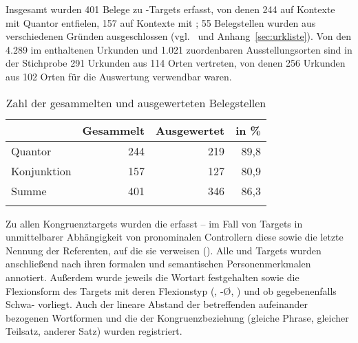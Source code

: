 \label{phsec:caohiatus}

Insgesamt wurden 401 Belege zu -Targets erfasst, von denen 244 auf
Kontexte mit Quantor entfielen, 157 auf Kontexte mit ; 55
Belegstellen wurden aus verschiedenen Gründen ausgeschlossen
(vgl.~ und Anhang~\ref{sec:urkliste}). Von den 4.289 im
\CAO{} enthaltenen Urkunden und 1.021 zuordenbaren Ausstellungsorten sind in
der Stichprobe 291 Urkunden aus 114 Orten vertreten, von denen 256 Urkunden aus
102 Orten für die Auswertung verwendbar waren.

\begin{table}
\centering
\caption{Zahl der gesammelten und ausgewerteten Belegstellen}
\begin{tabular}{l r r r}
\lsptoprule

%
	& Gesammelt
	& Ausgewertet
	& in \%
	\\

\midrule


Quantor
	& 244 %
	& 219 %
	& 89,8 %
	\\

Konjunktion
	& 157 %
	& 127 %
	& 80,9 %
	\\

\midrule

Summe
	& 401 %
	& 346 %
	& 86,3 %
	\\

\lspbottomrule
\end{tabular}
\label{tab:ausgewcao}
\end{table}

Zu allen Kongruenztargets wurden die  erfasst -- im Fall von
Targets in unmittelbarer Abhängigkeit von pronominalen
Controllern diese sowie die letzte Nennung der Referenten, auf
die sie verweisen (). Alle 
und Targets wurden anschließend nach ihren formalen
und semantischen Personenmerkmalen
annotiert. Außerdem wurde jeweils die Wortart festgehalten sowie die
Flexionsform des Targets mit deren Flexionstyp (, -Ø,
) und ob gegebenenfalls Schwa- vorliegt. Auch der
lineare Abstand der betreffenden aufeinander bezogenen
Wortformen und die  der Kongruenzbeziehung
(gleiche Phrase, gleicher Teilsatz, anderer Satz) wurden registriert.


